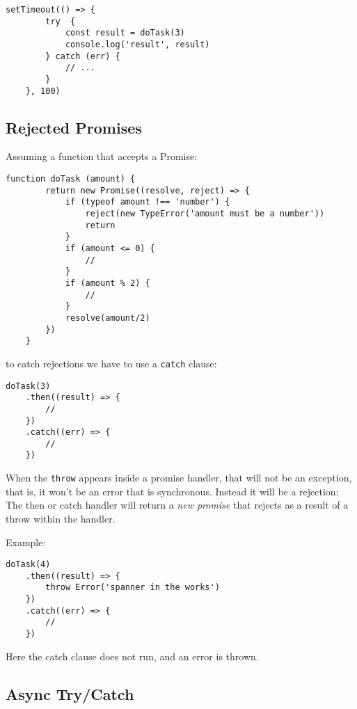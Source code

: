 \documentclass{scrartcl}
\begin{document}
\begin{lstlisting}[style=ES6]
    setTimeout(() => {
        try  {
            const result = doTask(3)
            console.log('result', result)
        } catch (err) {
            // ...
        }
    }, 100)
\end{lstlisting}

\subsection{Rejected Promises}

Assuming a function that accepts a Promise:

\begin{lstlisting}[style=ES6]
    function doTask (amount) {
        return new Promise((resolve, reject) => {
            if (typeof amount !== 'number') {
                reject(new TypeError('amount must be a number'))
                return
            }
            if (amount <= 0) {
                //
            }
            if (amount % 2) {
                //
            }
            resolve(amount/2)
        })
    }
\end{lstlisting}

to catch rejections we have to use a \lstinline|catch| clause:

\begin{lstlisting}[style=ES6]
    doTask(3)
    .then((result) => {
        //
    })
    .catch((err) => {
        //
    })
\end{lstlisting}

When the \lstinline|throw| appears inside a promise handler, that will not be an exception, that is, it won't be an error that is synchronous.
Instead it will be a rejection: The then or catch handler will return a \textit{new promise} that rejects as a result of a throw within the handler.

Example:

\begin{lstlisting}[style=ES6]
    doTask(4)
    .then((result) => {
        throw Error('spanner in the works')
    })
    .catch((err) => {
        //
    })
\end{lstlisting}

Here the catch clause does not run, and an error is thrown.

\subsection{Async Try/Catch}
\end{document}
